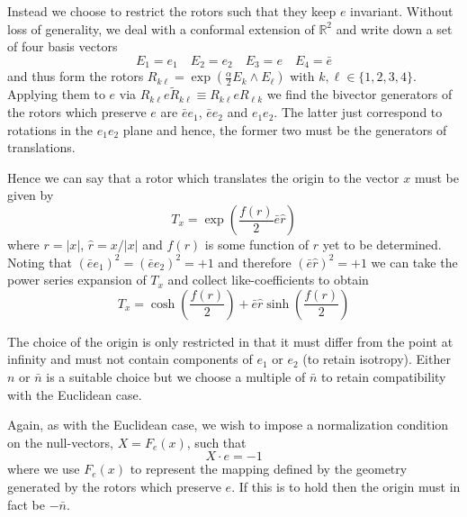 Instead we choose to restrict the rotors such that they keep $e$
invariant. Without loss of generality, we deal with a conformal extension of
$\mathbb{R}^2$ and write down a set of four basis vectors
\begin{equation}
E_1 = e_1 \quad E_2 = e_2 \quad E_3 = e \quad E_4 = \bar{e}
\end{equation}
and thus form the rotors $R_{k\ell } = \exp\left(\frac{\alpha}{2}E_k \wedge E_\ell\right)$ with $k,\ell \in \{1,2,3,4\}$.
Applying them to $e$ via $R_{k\ell }e\tilde{R}_{k\ell } \equiv R_{k\ell }eR_{\ell k}$ we find
the bivector generators of the rotors which preserve $e$ are $\bar{e}e_1$, 
$\bar{e}e_2$ and $e_1e_2$. The latter just correspond to rotations in the
$e_1e_2$ plane and hence, the former two must be the generators of
translations.

Hence we can say that a rotor which translates the origin to the vector
$x$ must be given by
\begin{equation}
T_x = \exp\left(\frac{f(r)}{2}\bar{e}\hat{r}\right)
\end{equation}
where $r = |x|$, $\hat{r} = x/|x|$ and $f(r)$ is some function of $r$ yet to
be determined. Noting that $(\bar{e}{e_1})^2 = (\bar{e}e_2)^2 = +1$ and therefore
$(\bar{e}\hat{r})^2 = +1$ we can take the power series expansion of $T_x$ and
collect like-coefficients to obtain
\begin{equation}
T_x = \cosh\left(\frac{f(r)}{2}\right) + \bar{e}\hat{r}\sinh\left(\frac{f(r)}{2}\right)
\label{eqn:nonEuclidTrans1}
\end{equation}

The choice of the origin is only restricted in that it must differ from the 
point at infinity and must not contain components of $e_1$ or $e_2$ (to retain
isotropy). Either $n$ or $\bar{n}$ is a suitable choice but we choose
a multiple of $\bar{n}$
to retain compatibility with the Euclidean case.

Again, as with the Euclidean case, we wish to impose a normalization condition 
on the null-vectors, 
$X = F_e(x)$, such that 
\begin{equation}
X \cdot e = -1
\end{equation}
where we use $F_e(x)$ to represent the mapping defined by the geometry
generated by the rotors which
preserve $e$. If this is to hold then the origin must in fact be $-\bar{n}$.

